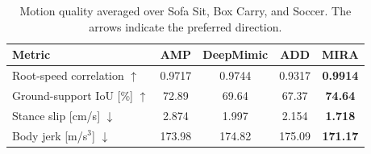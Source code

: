 \begin{table}[t]
\caption{Motion quality averaged over Sofa Sit, Box Carry,
and Soccer. The arrows indicate the preferred direction.}
\label{tab:motion_quality}
\centering\footnotesize
\setlength{\tabcolsep}{3pt}
\begin{tabular}{@{}lcccc@{}}\toprule
Metric & AMP & DeepMimic & ADD & MIRA \\
\midrule
Root-speed correlation $\uparrow$ & 0.9717 & 0.9744 & 0.9317 & \textbf{0.9914} \\
Ground-support IoU [\%] $\uparrow$ & 72.89 & 69.64 & 67.37 & \textbf{74.64} \\
Stance slip [cm/s] $\downarrow$ & 2.874 & 1.997 & 2.154 & \textbf{1.718} \\
Body jerk [m/s$^3$] $\downarrow$ & 173.98 & 174.82 & 175.09 & \textbf{171.17} \\
\bottomrule\end{tabular}
\end{table}
